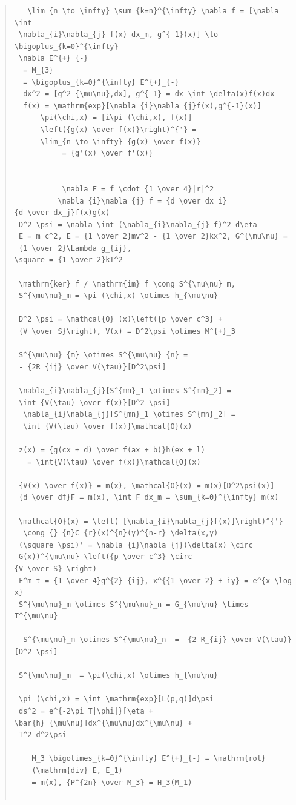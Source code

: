 \documentclass{jsarticle}
\begin{document}
\begin{quote}
\begin{verbatim}
   \lim_{n \to \infty} \sum_{k=n}^{\infty} \nabla f = [\nabla \int 
 \nabla_{i}\nabla_{j} f(x) dx_m, g^{-1}(x)] \to \bigoplus_{k=0}^{\infty}  
 \nabla E^{+}_{-} 
  = M_{3} 
  = \bigoplus_{k=0}^{\infty} E^{+}_{-} 
  dx^2 = [g^2_{\mu\nu},dx], g^{-1} = dx \int \delta(x)f(x)dx 
  f(x) = \mathrm{exp}[\nabla_{i}\nabla_{j}f(x),g^{-1}(x)] 
	  \pi(\chi,x) = [i\pi (\chi,x), f(x)] 
	  \left({g(x) \over f(x)}\right)^{'} =
	  \lim_{n \to \infty} {g(x) \over f(x)} 
           = {g'(x) \over f'(x)} 


		   \nabla F = f \cdot {1 \over 4}|r|^2
		  \nabla_{i}\nabla_{j} f = {d \over dx_i}
{d \over dx_j}f(x)g(x) 
 D^2 \psi = \nabla \int (\nabla_{i}\nabla_{j} f)^2 d\eta 
 E = m c^2, E = {1 \over 2}mv^2 - {1 \over 2}kx^2, G^{\mu\nu} = 
 {1 \over 2}\Lambda g_{ij}, 
\square = {1 \over 2}kT^2 

 \mathrm{ker} f / \mathrm{im} f \cong S^{\mu\nu}_m, 
 S^{\mu\nu}_m = \pi (\chi,x) \otimes h_{\mu\nu} 

 D^2 \psi = \mathcal{O} (x)\left({p \over c^3} + 
 {V \over S}\right), V(x) = D^2\psi \otimes M^{+}_3 

 S^{\mu\nu}_{m} \otimes S^{\mu\nu}_{n} = 
 - {2R_{ij} \over V(\tau)}[D^2\psi] 

 \nabla_{i}\nabla_{j}[S^{mn}_1 \otimes S^{mn}_2] = 
 \int {V(\tau) \over f(x)}[D^2 \psi] 
  \nabla_{i}\nabla_{j}[S^{mn}_1 \otimes S^{mn}_2] = 
  \int {V(\tau) \over f(x)}\mathcal{O}(x) 

 z(x) = {g(cx + d) \over f(ax + b)}h(ex + l) 
   = \int{V(\tau) \over f(x)}\mathcal{O}(x) 

 {V(x) \over f(x)} = m(x), \mathcal{O}(x) = m(x)[D^2\psi(x)] 
 {d \over df}F = m(x), \int F dx_m = \sum_{k=0}^{\infty} m(x) 

 \mathcal{O}(x) = \left( [\nabla_{i}\nabla_{j}f(x)]\right)^{'} 
  \cong {}_{n}C_{r}(x)^{n}(y)^{n-r} \delta(x,y) 
 (\square \psi)' = \nabla_{i}\nabla_{j}(\delta(x) \circ 
 G(x))^{\mu\nu} \left({p \over c^3} \circ 
{V \over S} \right) 
 F^m_t = {1 \over 4}g^{2}_{ij}, x^{{1 \over 2} + iy} = e^{x \log x} 
 S^{\mu\nu}_m \otimes S^{\mu\nu}_n = G_{\mu\nu} \times T^{\mu\nu} 

  S^{\mu\nu}_m \otimes S^{\mu\nu}_n  = -{2 R_{ij} \over V(\tau)}[D^2 \psi] 

 S^{\mu\nu}_m  = \pi(\chi,x) \otimes h_{\mu\nu} 

 \pi (\chi,x) = \int \mathrm{exp}[L(p,q)]d\psi 
 ds^2 = e^{-2\pi T|\phi|}[\eta + \bar{h}_{\mu\nu}]dx^{\mu\nu}dx^{\mu\nu} + 
 T^2 d^2\psi 

    M_3 \bigotimes_{k=0}^{\infty} E^{+}_{-} = \mathrm{rot}
    (\mathrm{div} E, E_1)
    = m(x), {P^{2n} \over M_3} = H_3(M_1) 


\end{verbatim}
\end{quote}
\end{document}
